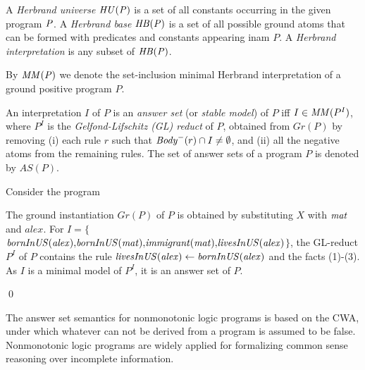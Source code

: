 \begin{definition}
A \emph{Herbrand universe}  $\mathit{HU(P)}$ is a set of all constants occurring in the given program $\mathit{P}$. A \emph{Herbrand base}  $\mathit{HB(P)}$ is a set of all possible ground atoms that can be formed with predicates and constants appearing inam $P$. A \emph{Herbrand interpretation} is any subset of $\mathit{HB(P)}$.
\end{definition}

 By $\mathit{MM(P)}$ we denote the set-inclusion minimal Herbrand interpretation of a ground positive program $P$.
\begin{definition}
An interpretation $I$ of $P$ is an \emph{answer set} (or \emph{stable model}) of $P$ iff $I \in \mathit{MM}(P^I)$, where $P^I$ is the \emph{Gelfond-Lifschitz (GL) reduct} of $P$, obtained from $Gr(P)$ by removing (i) each rule $r$ such that $\mathit{Body}^-(r) \cap I\neq\emptyset$, and (ii) all the negative atoms from the remaining rules. The set of answer sets of a program $P$ is denoted by $AS(P)$.
\end{definition}
%
\begin{example}
Consider the program \\
{\small {}}
            
\normalsize
{\smallskip

\noindent            
The ground instantiation $Gr(P)$ of $P$ is obtained by substituting $X$ with $\mathit{mat}$ and ${alex}$. For $I{=}\{${\small$\mathit{bornInUS(alex){,}bornInUS(mat){,}immigrant(mat){,}livesInUS(alex)}$}$\}$, the GL-reduct $P^I$ of $P$ contains the rule $\mathit{livesInUS(alex)\leftarrow bornInUS(alex)}$ and the facts (1)-(3). As $I$ is a minimal model of $P^I$, it  is an answer set of $P$.}\qed
\end{example}

The answer set semantics for nonmonotonic logic programs is based on the CWA, under which whatever can not be derived from a program is assumed to be false. Nonmonotonic logic programs are widely applied for formalizing common sense reasoning over incomplete information.
